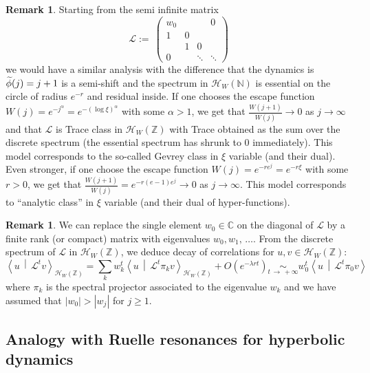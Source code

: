 \documentclass[10pt]{amsart}
\theoremstyle{definition}\newtheorem{defi}[theo]{Definition}\newtheorem{rema}[theo]{Remark}\newtheorem{exam}[theo]{Example}\newtheorem{exem}[theo]{Example}\newtheorem{nota}[theo]{Notation}
\newcommand{\clH}{\mathcal{H}}
\newcommand{\clL}{\mathcal{L}}
\newcommand{\bbC}{\mathbb{C}}
\newcommand{\bbZ}{\mathbb{Z}}
\newcommand{\bbN}{\mathbb{N}}
\let\oldtilde\tilde
\renewcommand*{\tilde}[1]{\mathchoice{\widetilde{#1}}{\widetilde{#1}}{\oldtilde{#1}}{\oldtilde{#1}}}
\begin{document}
\begin{rema}
Starting from the semi infinite matrix
\[
\clL:=\
\begin{pmatrix}
w_{0} & & & 0\\
1 & 0\\
& 1 & 0\\
0 & & \ddots & \ddots
\end{pmatrix}
\]
we would have a similar analysis with the difference that the dynamics is $\tilde{\phi}(j)=j+1$ is a semi-shift and the spectrum in $\clH _{W}(\bbN)$ is essential on the circle of radius $e^{-r}$ and residual inside. If one chooses the escape function $W(j)=e^{-j^{\alpha}}=e^{-(\log\xi)^{\alpha}}$ with some $\alpha>1$, we get that $\frac{W(j+1)}{W(j)}\rightarrow0$ as $j\rightarrow\infty$ and that $\clL$ is Trace class in $\clH _{W}(\bbZ)$ with Trace obtained as the sum over the discrete spectrum (the essential spectrum has shrunk to $0$ immediately). This model corresponds to the so-called Gevrey class in $\xi$ variable (and their dual). Even stronger, if one choose the escape function $W\left(j\right)=e^{-re^{j}}=e^{-r\xi}$ with some $r>0$, we get that $\frac{W(j+1)}{W(j)}=e^{-r(e-1)e^{j}}\rightarrow0$ as $j\rightarrow\infty$. This model corresponds to ``analytic class'' in $\xi$ variable (and their dual of hyper-functions).
\end{rema}


\begin{rema}
We can replace the single element $w_{0}\in\bbC$ on the diagonal of $\clL$ by a finite rank (or compact) matrix with eigenvalues $w_{0},w_{1},\,\ldots$. From the discrete spectrum of $\clL$ in $\clH _{W}(\bbZ)$, we deduce decay of correlations for $u,v\in\clH _{W}(\bbZ)$:
\[
\left\langle u\,\middle|\,\clL^{t}v\right\rangle_{\clH _{W}\left(\bbZ\right)}=\sum_{k}w_{k}^{t}\left\langle u\,\middle|\,\clL^{t}\pi_{k}v\right\rangle_{\clH _{W}\left(\bbZ\right)}+O\left(e^{-\lambda rt}\right)\underset{t\,\rightarrow\,+\infty}{\sim}w_{0}^{t}\left\langle u\,\middle|\,\clL^{t}\pi_{0}v\right\rangle
\]
where $\pi_{k}$ is the spectral projector associated to the eigenvalue $w_{k}$ and we have assumed that $|w_{0}|>|w_{j}|$ for $j\geq1$.
\end{rema}


\subsection{Analogy with Ruelle resonances for hyperbolic dynamics}
\end{document}
